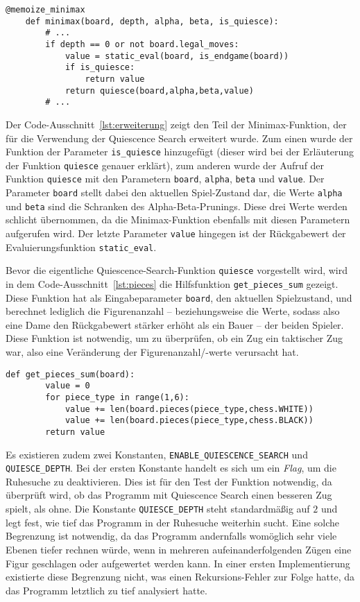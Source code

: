 \begin{lstlisting}[caption=Erweiterung der Funktion des Minimax-Algorithmus für die Verwendung von Quiescence Search, label=lst:erweiterung]
	@memoize_minimax
	def minimax(board, depth, alpha, beta, is_quiesce):
		# ...
		if depth == 0 or not board.legal_moves:
			value = static_eval(board, is_endgame(board))
			if is_quiesce:
				return value
			return quiesce(board,alpha,beta,value)
		# ...
\end{lstlisting}

Der Code-Ausschnitt~\ref{lst:erweiterung} zeigt den Teil der Minimax-Funktion, der für die Verwendung der Quiescence Search erweitert wurde. Zum einen wurde der Funktion der Parameter \texttt{is\_quiesce} hinzugefügt (dieser wird bei der Erläuterung der Funktion \texttt{quiesce} genauer erklärt), zum anderen wurde der Aufruf der Funktion \texttt{quiesce} mit den Parametern \texttt{board}, \texttt{alpha}, \texttt{beta} und \texttt{value}. Der Parameter \texttt{board} stellt dabei den aktuellen Spiel-Zustand dar, die Werte \texttt{alpha} und \texttt{beta} sind die Schranken des Alpha-Beta-Prunings. Diese drei Werte werden schlicht übernommen, da die Minimax-Funktion ebenfalls mit diesen Parametern aufgerufen wird. Der letzte Parameter \texttt{value} hingegen ist der Rückgabewert der Evaluierungsfunktion \texttt{static\_eval}.

Bevor die eigentliche Quiescence-Search-Funktion \texttt{quiesce} vorgestellt wird, wird in dem Code-Ausschnitt~\ref{lst:pieces} die Hilfsfunktion \texttt{get\_pieces\_sum} gezeigt. Diese Funktion hat als Eingabeparameter \texttt{board}, den aktuellen Spielzustand, und berechnet lediglich die Figurenanzahl -- beziehungsweise die Werte, sodass also eine Dame den Rückgabewert stärker erhöht als ein Bauer -- der beiden Spieler. Diese Funktion ist notwendig, um zu überprüfen, ob ein Zug ein taktischer Zug war, also eine Veränderung der Figurenanzahl/-werte verursacht hat.

\begin{lstlisting}[caption=Hilfsfunktion für die Differenzierung taktischer Züge, label=lst:pieces]
	def get_pieces_sum(board):
    	value = 0
    	for piece_type in range(1,6):
        	value += len(board.pieces(piece_type,chess.WHITE))
        	value += len(board.pieces(piece_type,chess.BLACK))
    	return value
\end{lstlisting}

Es existieren zudem zwei Konstanten, \texttt{ENABLE\_QUIESCENCE\_SEARCH} und \texttt{QUIESCE\_DEPTH}. Bei der ersten Konstante handelt es sich um ein \textit{Flag}, um die Ruhesuche zu deaktivieren. Dies ist für den Test der Funktion notwendig, da überprüft wird, ob das Programm mit Quiescence Search einen besseren Zug spielt, als ohne. Die Konstante \texttt{QUIESCE\_DEPTH} steht standardmäßig auf $2$ und legt fest, wie tief das Programm in der Ruhesuche weiterhin sucht. Eine solche Begrenzung ist notwendig, da das Programm andernfalls womöglich sehr viele Ebenen tiefer rechnen würde, wenn in mehreren aufeinanderfolgenden Zügen eine Figur geschlagen oder aufgewertet werden kann. In einer ersten Implementierung existierte diese Begrenzung nicht, was einen Rekursions-Fehler zur Folge hatte, da das Programm letztlich zu tief analysiert hatte.

